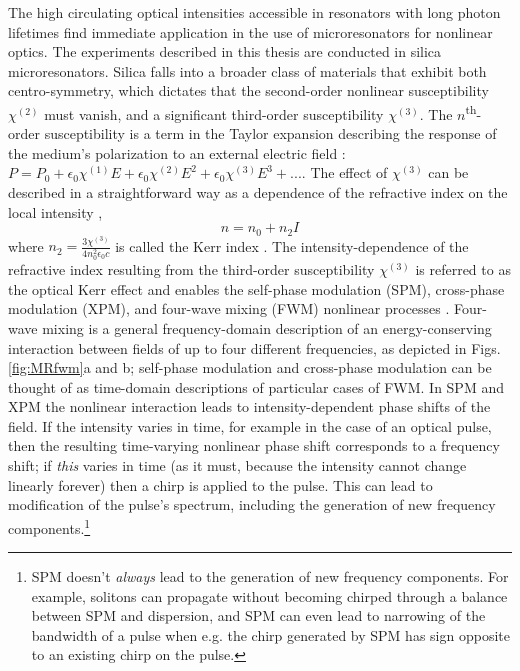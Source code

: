 The high circulating optical intensities accessible in resonators with long photon lifetimes find immediate application in the use of microresonators for nonlinear optics. The experiments described in this thesis are conducted in silica microresonators. Silica falls into a broader class of materials that exhibit both centro-symmetry, which dictates that the second-order nonlinear susceptibility $\chi^{(2)}$ must vanish, and a significant third-order susceptibility $\chi^{(3)}$. The $n$\textsuperscript{th}-order susceptibility is a term in the Taylor expansion describing the response of the medium's polarization to an external electric field \cite{Boyd2003}: $P=P_0+\epsilon_0 \chi^{(1)} E + \epsilon_0 \chi^{(2)} E^2 + \epsilon_0 \chi^{(3)} E^3+...$. The effect of $\chi^{(3)}$ can be described in a straightforward way as a dependence of the refractive index on the local intensity \cite{Agrawal2007},
\begin{equation}
n=n_0+n_2 I \label{eq:KerrIndex}
\end{equation}
where $n_2=\frac{3\chi^{(3)}}{4n_0^2\epsilon_0 c}$ is called the Kerr index \cite{DelCoso2004,Agrawal2007}. The intensity-dependence of the refractive index resulting from the third-order susceptibility $\chi^{(3)}$ is referred to as the optical Kerr effect and enables the self-phase modulation (SPM), cross-phase modulation (XPM), and four-wave mixing (FWM) nonlinear processes \cite{Boyd2003}. Four-wave mixing is a general frequency-domain description of an energy-conserving interaction between fields of up to four different frequencies, as depicted in Figs. \ref{fig:MRfwm}a and b; self-phase modulation and cross-phase modulation can be thought of as time-domain descriptions of particular cases of FWM. In SPM and XPM the nonlinear interaction leads to intensity-dependent phase shifts of the field. If the intensity varies in time, for example in the case of an optical pulse, then the resulting time-varying nonlinear phase shift corresponds to a frequency shift; if \textit{this} varies in time (as it must, because the intensity cannot change linearly forever) then a chirp is applied to the pulse. This can lead to modification of the pulse's spectrum, including the generation of new frequency components.\footnote{SPM doesn't \textit{always} lead to the generation of new frequency components. For example, solitons can propagate without becoming chirped through a balance between SPM and dispersion, and SPM can even lead to narrowing of the bandwidth of a pulse when e.g. the chirp generated by SPM has sign opposite to an existing chirp on the pulse.}

